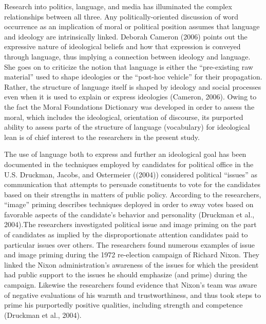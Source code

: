 \documentclass[,man]{apa6}
\begin{document}
Research into politics, language, and media has illuminated the complex relationships between all three. Any politically-oriented discussion of word occurrence as an implication of moral or political position assumes that language and ideology are intrinsically linked. Deborah Cameron (2006) points out the expressive nature of ideological beliefs and how that expression is conveyed through language, thus implying a connection between ideology and language. She goes on to criticize the notion that language is either the \enquote{pre-existing raw material} used to shape ideologies or the \enquote{post-hoc vehicle} for their propagation. Rather, the structure of language itself is shaped by ideology and social processes even when it is used to explain or express ideologies (Cameron, 2006). Owing to the fact the Moral Foundations Dictionary was developed in order to assess the moral, which includes the ideological, orientation of discourse, its purported ability to assess parts of the structure of language (vocabulary) for ideological lean is of chief interest to the researchers in the present study.

The use of language both to express and further an ideological goal has been documented in the techniques employed by candidates for political office in the U.S. Druckman, Jacobs, and Ostermeier ((2004)) considered political \enquote{issues} as communication that attempts to persuade constituents to vote for the candidates based on their strengths in matters of public policy. According to the researchers, \enquote{image} priming describes techniques deployed in order to sway votes based on favorable aspects of the candidate's behavior and personality (Druckman et al., 2004).The researchers investigated political issue and image priming on the part of candidates as implied by the disproportionate attention candidates paid to particular issues over others. The researchers found numerous examples of issue and image priming during the 1972 re-election campaign of Richard Nixon. They linked the Nixon administration's awareness of the issues for which the president had public support to the issues he should emphasize (and prime) during the campaign. Likewise the researchers found evidence that Nixon's team was aware of negative evaluations of his warmth and trustworthiness, and thus took steps to prime his purportedly positive qualities, including strength and competence (Druckman et al., 2004).
\end{document}
